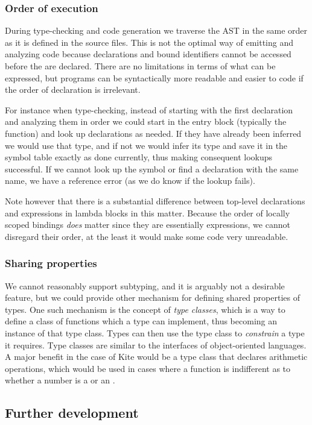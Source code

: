 \subsubsection{Order of execution}
During type-checking and code generation we traverse the AST in the same order as it is defined in the source files. This is not the optimal way of emitting and analyzing code because declarations and bound identifiers cannot be accessed before the are declared. There are no limitations in terms of what can be expressed, but programs can be syntactically more readable and easier to code if the order of declaration is irrelevant.

For instance when type-checking, instead of starting with the first declaration and analyzing them in order we could start in the entry block (typically the  function) and look up declarations as needed. If they have already been inferred we would use that type, and if not we would infer its type and save it in the symbol table exactly as done currently, thus making consequent lookups successful. If we cannot look up the symbol or find a declaration with the same name, we have a reference error (as we do know if the lookup fails).

Note however that there is a substantial difference between top-level declarations and expressions in lambda blocks in this matter. Because the order of locally scoped bindings \emph{does} matter since they are essentially  expressions, we cannot disregard their order, at the least it would make some code very unreadable.

\subsubsection{Sharing properties}
We cannot reasonably support subtyping, and it is arguably not a desirable feature, but we could provide other mechanism for defining shared properties of types. One such mechanism is the concept of \emph{type classes}, which is a way to define a class of functions which a type can implement, thus becoming an instance of that type class. Types can then use the type class to \emph{constrain} a type it requires. Type classes are similar to the interfaces of object-oriented languages. A major benefit in the case of Kite would be a  type class that declares arithmetic operations, which would be used in cases where a function is indifferent as to whether a number is a  or an .

\subsection{Further development}

